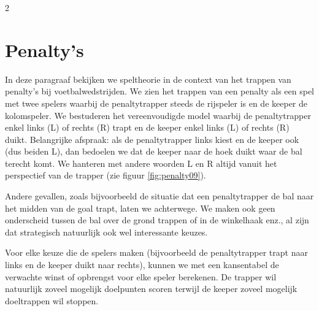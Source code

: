 \begin{multicols}{2}
\section{Penalty's}\label{sec:penalties}

In deze paragraaf bekijken we speltheorie in de context van het trappen van penalty's bij voetbalwedstrijden. We zien het trappen van een penalty als een spel met twee spelers waarbij de penaltytrapper steeds de rijspeler is en de keeper de kolomspeler. We bestuderen het vereenvoudigde model waarbij de penaltytrapper enkel links (L) of rechts (R) trapt en de keeper enkel links (L) of rechts (R) duikt. Belangrijke afspraak: als de penaltytrapper links kiest en de keeper ook (dus beiden L), dan bedoelen we dat de keeper naar de hoek duikt waar de bal terecht komt. We hanteren met andere woorden L en R altijd vanuit het perspectief van de trapper  (zie figuur \ref{fig:penalty09}).


Andere gevallen, zoals bijvoorbeeld de situatie dat een penaltytrapper de bal naar het midden van de goal trapt, laten we achterwege. We maken ook geen onderscheid tussen de bal over de grond trappen of in de winkelhaak enz., al zijn dat strategisch natuurlijk ook wel interessante keuzes.

Voor elke keuze die de spelers maken (bijvoorbeeld de penaltytrapper trapt naar links en de keeper duikt naar rechts), kunnen we met een kansentabel de verwachte winst of opbrengst voor elke speler berekenen. De trapper wil natuurlijk zoveel mogelijk doelpunten scoren terwijl de keeper zoveel mogelijk doeltrappen wil stoppen.


\end{multicols}
